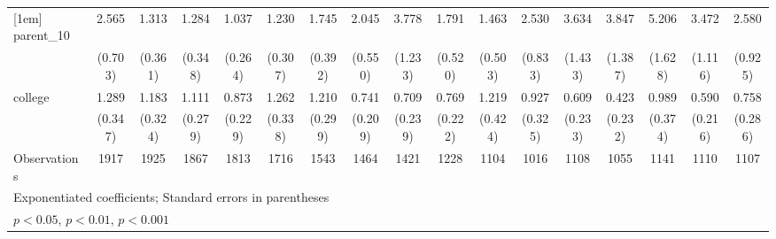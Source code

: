 {\begin{tabular}{l*{16}{c}}
[1em]
parent\_10           &       2.565\sym{***}&       1.313         &       1.284         &       1.037         &       1.230         &       1.745\sym{*}  &       2.045\sym{**} &       3.778\sym{***}&       1.791\sym{*}  &       1.463         &       2.530\sym{**} &       3.634\sym{**} &       3.847\sym{***}&       5.206\sym{***}&       3.472\sym{***}&       2.580\sym{**} \\
                    &     (0.703)         &     (0.361)         &     (0.348)         &     (0.264)         &     (0.307)         &     (0.392)         &     (0.550)         &     (1.233)         &     (0.520)         &     (0.503)         &     (0.833)         &     (1.433)         &     (1.387)         &     (1.628)         &     (1.116)         &     (0.925)         \\
[1em]
college             &       1.289         &       1.183         &       1.111         &       0.873         &       1.262         &       1.210         &       0.741         &       0.709         &       0.769         &       1.219         &       0.927         &       0.609         &       0.423         &       0.989         &       0.590         &       0.758         \\
                    &     (0.347)         &     (0.324)         &     (0.279)         &     (0.229)         &     (0.338)         &     (0.299)         &     (0.209)         &     (0.239)         &     (0.222)         &     (0.424)         &     (0.325)         &     (0.233)         &     (0.232)         &     (0.374)         &     (0.216)         &     (0.286)         \\
\hline
Observations        &        1917         &        1925         &        1867         &        1813         &        1716         &        1543         &        1464         &        1421         &        1228         &        1104         &        1016         &        1108         &        1055         &        1141         &        1110         &        1107         \\
\hline\hline
\multicolumn{17}{l}{\footnotesize Exponentiated coefficients; Standard errors in parentheses}\\
\multicolumn{17}{l}{\footnotesize \sym{*} \(p<0.05\), \sym{**} \(p<0.01\), \sym{***} \(p<0.001\)}\\
\end{tabular}
}
